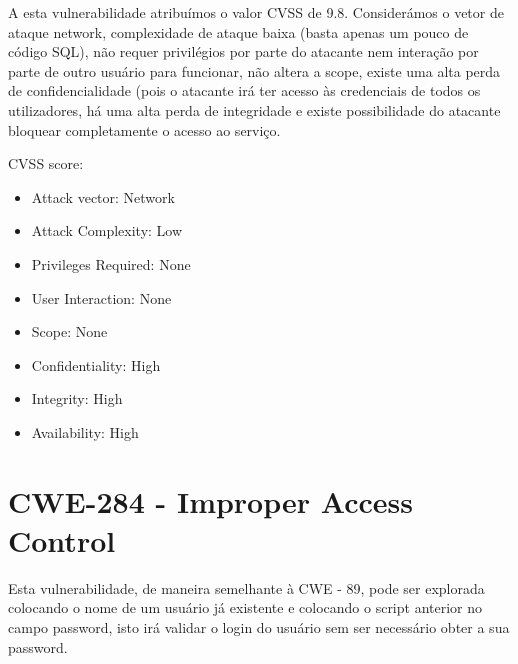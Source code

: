 \documentclass[12pt]{report}
\begin{document}
A esta vulnerabilidade atribuímos o valor CVSS de 9.8. Considerámos o vetor de ataque network, complexidade de ataque baixa (basta apenas um pouco de código SQL), não requer privilégios por parte do atacante nem interação por parte de outro usuário para funcionar, não altera a scope, existe uma alta perda de confidencialidade (pois o atacante irá ter acesso às credenciais de todos os utilizadores, há uma alta perda de integridade e existe possibilidade do atacante bloquear completamente o acesso ao serviço.\par
CVSS score: \begin{itemize}
  \item Attack vector: Network
  \item Attack Complexity: Low
  \item Privileges Required: None
  \item User Interaction: None
  \item Scope: None
  \item Confidentiality: High
  \item Integrity: High
  \item Availability: High
\end{itemize}

\newpage
\section{CWE-284 - Improper Access Control} \label{284}
Esta vulnerabilidade, de maneira semelhante à CWE - 89, pode ser explorada colocando o nome de um usuário já existente e colocando o script anterior no campo password, isto irá validar o login do usuário sem ser necessário obter a sua password.
\end{document}

